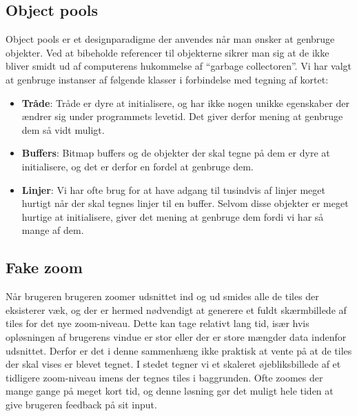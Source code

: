 \subsection{Object pools}
\label{subsec:objectPools}

Object pools er et designparadigme der anvendes når man ønsker at genbruge objekter. Ved at bibeholde referencer til objekterne sikrer man sig at de ikke bliver smidt ud af computerens hukommelse af ``garbage collectoren''. Vi har valgt at genbruge instanser af følgende klasser i forbindelse med tegning af kortet:

\begin{itemize}
	\item \textbf{Tråde}: Tråde er dyre at initialisere, og har ikke nogen unikke egenskaber der ændrer sig under programmets levetid. Det giver derfor mening at genbruge dem så vidt muligt.
	\item \textbf{Buffers}: Bitmap buffers og de objekter der skal tegne på dem er dyre at initialisere, og det er derfor en fordel at genbruge dem.
	\item \textbf{Linjer}: Vi har ofte brug for at have adgang til tusindvis af linjer meget hurtigt når der skal tegnes linjer til en buffer. Selvom disse objekter er meget hurtige at initialisere, giver det mening at genbruge dem fordi vi har så mange af dem.
\end{itemize}

\subsection{Fake zoom}
\label{subsec:fakeZoom}

Når brugeren brugeren zoomer udsnittet ind og ud smides alle de tiles der eksisterer væk, og der er hermed nødvendigt at generere et fuldt skærmbillede af tiles for det nye zoom-niveau. Dette kan tage relativt lang tid, især hvis opløsningen af brugerens vindue er stor eller der er store mængder data indenfor udsnittet. Derfor er det i denne sammenhæng ikke praktisk at vente på at de tiles der skal vises er blevet tegnet. I stedet tegner vi et skaleret øjebliksbillede af et tidligere zoom-niveau imens der tegnes tiles i baggrunden. Ofte zoomes der mange gange på meget kort tid, og denne løsning gør det muligt hele tiden at give brugeren feedback på sit input.